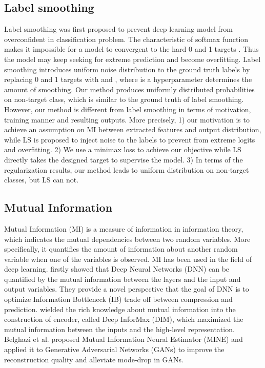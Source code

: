 \documentclass{article}
\theoremstyle{definition}
\begin{document}
\subsection{Label smoothing}
Label smoothing \cite{szegedy2016rethinking} was first proposed to prevent deep learning model from overconfident in classification problem. The characteristic of softmax function makes it impossible for a model to convergent to the hard 0 and 1 targets \cite{Goodfellow-et-al-2016}. Thus the model may keep seeking for extreme prediction and become overfitting. Label smoothing introduces uniform noise distribution  to the ground truth labels by replacing 0 and 1 targets with  and , where  is a hyperparameter determines the amount of smoothing. Our method produces uniformly distributed probabilities on non-target class, which is similar to the ground truth of label smoothing. However, our method is different from label smoothing in terms of motivation, training manner and resulting outputs. 
More precisely, 1) our motivation is to achieve an assumption on MI between extracted features and output distribution, while LS is proposed to inject noise to the labels to prevent from extreme logits and overfitting.
2) We use a minimax loss to achieve our objective while LS directly takes the designed target to supervise the model.
3) In terms of the regularization results, our method leads to uniform distribution on non-target classes, but LS can not.

\subsection{Mutual Information}
Mutual Information (MI) is a measure of information in information theory, which indicates the mutual dependencies between two random variables. More specifically, it quantifies the amount of information about another random variable when one of the variables is observed. 
MI has been used in the field of deep learning. 
\cite{tishby2015deep} firstly showed that Deep Neural Networks (DNN) can be quantified by the mutual information between the layers and the input and output variables. They provide a novel perspective that the goal of DNN is to optimize Information Bottleneck (IB) trade off between compression and prediction. 
\cite{hjelm2018learning} wielded the rich knowledge about mutual information into the construction of encoder, called Deep InforMax (DIM), which maximized the mutual information between the inputs and the high-level representation. Belghazi et al. \cite{belghazi2018mutual} proposed Mutual Information Neural Estimator (MINE) and applied it to Generative Adversarial Networks (GANs) 
\cite{goodfellow2014generative} to improve the reconstruction quality and alleviate mode-drop in GANs. 
\end{document}

